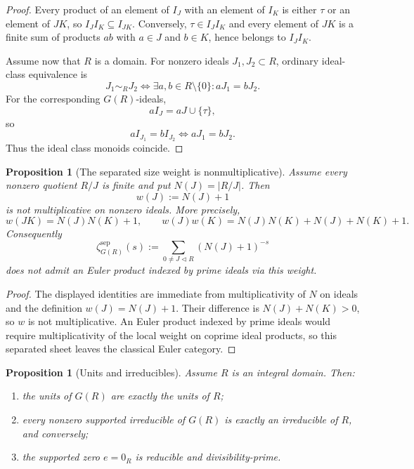\documentclass[11pt]{article}
\newcommand{\1}{\mathbf 1}
\newcommand{\sep}{\mathrm{sep}}
\newtheorem{proposition}[theorem]{Proposition}
\numberwithin{equation}{section}
\begin{document}
\begin{proof}
Every product of an element of $I_J$ with an element of $I_K$ is either $\tau$ or an element of $JK$, so $I_JI_K\subseteq I_{JK}$.  Conversely, $\tau\in I_JI_K$ and every element of $JK$ is a finite sum of products $ab$ with $a\in J$ and $b\in K$, hence belongs to $I_JI_K$.

Assume now that $R$ is a domain.  For nonzero ideals $J_1,J_2\subset R$, ordinary ideal-class equivalence is
\begin{equation}
  J_1\sim_R J_2
  \Longleftrightarrow
  \exists a,b\in R\setminus\{0\}: aJ_1=bJ_2.
\end{equation}
For the corresponding $G(R)$-ideals,
\begin{equation}
  aI_J=aJ\cup\{\tau\},
\end{equation}
so
\begin{equation}
  aI_{J_1}=bI_{J_2}\Longleftrightarrow aJ_1=bJ_2.
\end{equation}
Thus the ideal class monoids coincide.
\end{proof}

\begin{proposition}[The separated size weight is nonmultiplicative]\label{prop:nonmult-weight}
Assume every nonzero quotient $R/J$ is finite and put $N(J)=|R/J|$.  Then
\begin{equation}
  w(J):=N(J)+1
\end{equation}
is not multiplicative on nonzero ideals.  More precisely,
\begin{equation}
  w(JK)=N(J)N(K)+1,
  \qquad
  w(J)w(K)=N(J)N(K)+N(J)+N(K)+1.
\end{equation}
Consequently
\begin{equation}
  \zeta^{\sep}_{G(R)}(s):=\sum_{0\ne J\triangleleft R}(N(J)+1)^{-s}
\end{equation}
does not admit an Euler product indexed by prime ideals via this weight.
\end{proposition}

\begin{proof}
The displayed identities are immediate from multiplicativity of $N$ on ideals and the definition $w(J)=N(J)+1$.  Their difference is $N(J)+N(K)>0$, so $w$ is not multiplicative.  An Euler product indexed by prime ideals would require multiplicativity of the local weight on coprime ideal products, so this separated sheet leaves the classical Euler category.
\end{proof}

\begin{proposition}[Units and irreducibles]\label{prop:units-irred}
Assume $R$ is an integral domain.  Then:
\begin{enumerate}[label=\textup{(\arabic*)}]
\item the units of $G(R)$ are exactly the units of $R$;
\item every nonzero supported irreducible of $G(R)$ is exactly an irreducible of $R$, and conversely;
\item the supported zero $e=0_R$ is reducible and divisibility-prime.
\end{enumerate}
\end{proposition}
\end{document}
